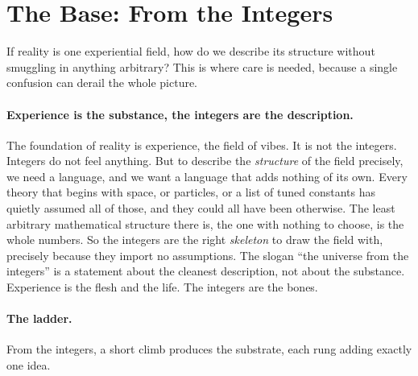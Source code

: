 \section{The Base: From the Integers}
\label{sec:integers}

If reality is one experiential field, how do we describe its structure without smuggling in
anything arbitrary? This is where care is needed, because a single confusion can derail the
whole picture.

\paragraph{Experience is the substance, the integers are the description.}
The foundation of reality is experience, the field of vibes. It is not the integers. Integers
do not feel anything. But to describe the \emph{structure} of the field precisely, we need a
language, and we want a language that adds nothing of its own. Every theory that begins with
space, or particles, or a list of tuned constants has quietly assumed all of those, and they
could all have been otherwise. The least arbitrary mathematical structure there is, the one
with nothing to choose, is the whole numbers. So the integers are the right \emph{skeleton}
to draw the field with, precisely because they import no assumptions. The slogan ``the
universe from the integers'' is a statement about the cleanest description, not about the
substance. Experience is the flesh and the life. The integers are the bones.

\paragraph{The ladder.}
From the integers, a short climb produces the substrate, each rung adding exactly one idea.

